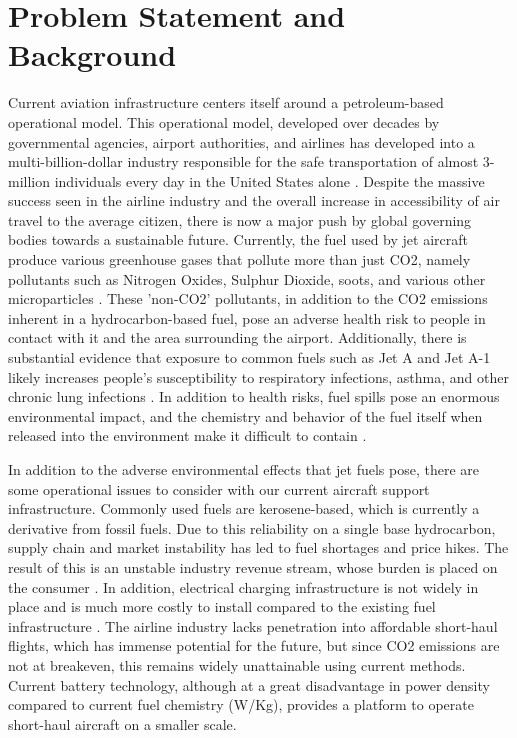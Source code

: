 \documentclass[../main.tex]{subfiles}
\begin{document}
\section{Problem Statement and Background}\label{probStatement}

Current aviation infrastructure centers itself around a petroleum-based operational model. This operational model, developed over decades by governmental agencies, airport authorities, and airlines has developed into a multi-billion-dollar industry responsible for the safe transportation of almost 3-million individuals every day in the United States alone \cite{ref19}. Despite the massive success seen in the airline industry and the overall increase in accessibility of air travel to the average citizen, there is now a major push by global governing bodies towards a sustainable future. Currently, the fuel used by jet aircraft produce various greenhouse gases that pollute more than just CO2, namely pollutants such as Nitrogen Oxides, Sulphur Dioxide, soots, and various other microparticles \cite{ref11}. These 'non-CO2' pollutants, in addition to the CO2 emissions inherent in a hydrocarbon-based fuel, pose an adverse health risk to people in contact with it and the area surrounding the airport. Additionally, there is substantial evidence that exposure to common fuels such as Jet A and Jet A-1 likely increases people's susceptibility to respiratory infections, asthma, and other chronic lung infections \cite{ref12}\cite{ref20}. In addition to health risks, fuel spills pose an enormous environmental impact, and the chemistry and behavior of the fuel itself when released into the environment make it difficult to contain \cite{ref14}\cite{ref15}.\par 
In addition to the adverse environmental effects that jet fuels pose, there are some operational issues to consider with our current aircraft support infrastructure. Commonly used fuels are kerosene-based, which is currently a derivative from fossil fuels. Due to this reliability on a single base hydrocarbon, supply chain and market instability has led to fuel shortages and price hikes. The result of this is an unstable industry revenue stream, whose burden is placed on the consumer \cite{ref13}. In addition, electrical charging infrastructure is not widely in place and is much more costly to install compared to the existing fuel infrastructure \cite{ref16}. The airline industry lacks penetration into affordable short-haul flights, which has immense potential for the future, but since CO2 emissions are not at breakeven, this remains widely unattainable using current methods. Current battery technology, although at a great disadvantage in power density compared to current fuel chemistry (W/Kg), provides a platform to operate short-haul aircraft on a smaller scale.\par 
\end{document}
